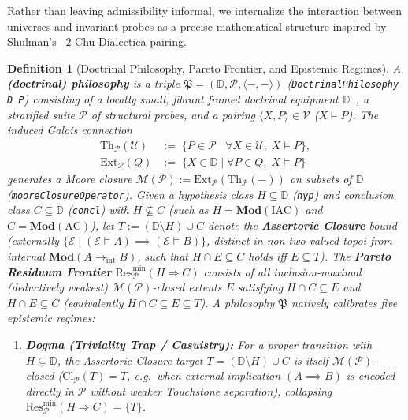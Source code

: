 \documentclass[10pt,twoside,openright]{book}
\theoremstyle{crmplain}
\theoremstyle{crmdef}
\newtheorem{definition}[theorem]{Definition}
\theoremstyle{crmremark}
\begin{document}
Rather than leaving admissibility informal, we internalize the interaction between universes and invariant probes as a precise mathematical structure inspired by Shulman's~\cite{Shulman20} $2$-Chu-Dialectica pairing.

\begin{definition}[Doctrinal Philosophy, Pareto Frontier, and Epistemic Regimes]\label{def:doctrinal-philosophy}%
%
A \textbf{(doctrinal) philosophy} is a triple $\mathfrak{P} = (\mathbb{D}, \mathcal{P}, \langle -, - \rangle)$ (\texttt{DoctrinalPhilosophy D P}) consisting of a locally small, fibrant framed doctrinal equipment $\mathbb{D}$~\cite{Shulman08,HHLN23}, a stratified suite $\mathcal{P}$ of structural probes, and a pairing $\langle X, P \rangle \in \mathcal{V}$ ($X \models P$). The induced Galois connection
\[
  \begin{aligned}
    \mathrm{Th}_{\mathcal{P}}(\mathcal{U}) &:=\; \{P \in \mathcal{P} \mid \forall X \in \mathcal{U},\; X \models P\}, \\
    \mathrm{Ext}_{\mathcal{P}}(Q) &:=\; \{X \in \mathbb{D} \mid \forall P \in Q,\; X \models P\}
  \end{aligned}
\]
generates a Moore closure $\mathcal{M}(\mathcal{P}) := \mathrm{Ext}_{\mathcal{P}}(\mathrm{Th}_{\mathcal{P}}(-))$ on subsets of $\mathbb{D}$ (\texttt{mooreClosureOperator}). Given a hypothesis class $H \subseteq \mathbb{D}$ (\texttt{hyp}) and conclusion class $C \subseteq \mathbb{D}$ (\texttt{concl}) with $H \not\subseteq C$ (such as $H = \mathbf{Mod}(\mathrm{IAC})$ and $C = \mathbf{Mod}(\mathrm{AC})$), let $T := (\mathbb{D} \setminus H) \cup C$ denote the \textbf{Assertoric Closure} bound (externally $\{\mathcal{E} \mid (\mathcal{E} \models A) \implies (\mathcal{E} \models B)\}$, distinct in non-two-valued topoi from internal $\mathbf{Mod}(A \to_{\mathrm{int}} B)$, such that $H \cap E \subseteq C$ holds iff $E \subseteq T$). The \textbf{Pareto Residuum Frontier} $\mathrm{Res}_{\mathcal{P}}^{\min}(H \Rightarrow C)$ consists of all inclusion-maximal (deductively weakest) $\mathcal{M}(\mathcal{P})$-closed extents $E$ satisfying $H \cap C \subseteq E$ and $H \cap E \subseteq C$ (equivalently $H \cap C \subseteq E \subseteq T$). A philosophy $\mathfrak{P}$ natively calibrates five epistemic regimes:
\begin{enumerate}[label=\textup{(\arabic*)},leftmargin=2.0em]
  \item \textbf{Dogma (Triviality Trap / Casuistry):} For a proper transition with $H \subsetneq \mathbb{D}$, the Assertoric Closure target $T = (\mathbb{D} \setminus H) \cup C$ is itself $\mathcal{M}(\mathcal{P})$-closed ($\mathrm{Cl}_{\mathcal{P}}(T) = T$, e.g.\ when external implication $(A \implies B)$ is encoded directly in $\mathcal{P}$ without weaker Touchstone separation), collapsing $\mathrm{Res}_{\mathcal{P}}^{\min}(H \Rightarrow C) = \{T\}$.

\end{enumerate}
\end{definition}
\end{document}
